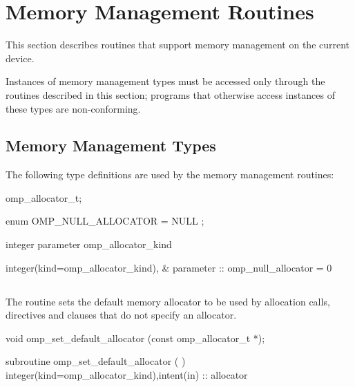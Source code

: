 \section{Memory Management Routines}
\label{sec:Memory Management Routines}
This section describes routines that support memory management on the current device.

Instances of memory management types must be accessed only through the routines described in this section; programs that otherwise access instances of these types are non-conforming.

\subsection{Memory Management Types}
\label{subsec:Memory Management Types}

The following type definitions are used by the memory management routines:

\begin{ccppspecific}
\begin{ompEnv}
omp_allocator_t;

enum { OMP_NULL_ALLOCATOR = NULL };
\end{ompEnv}
\end{ccppspecific}

\begin{fortranspecific}
\begin{ompfEnum}
integer parameter omp_allocator_kind

integer(kind=omp_allocator_kind), &
        parameter :: omp_null_allocator = 0
\end{ompfEnum}
\end{fortranspecific}

\subsection{}
\label{subsec:omp_set_default_allocator}

\summary
The  routine sets the default memory allocator to be used by allocation calls,  directives and  clauses that do not specify an allocator.

\format
\ccppspecificstart
\begin{ompcFunction}
void omp_set_default_allocator (const omp_allocator_t *);
\end{ompcFunction}
\ccppspecificend
\fortranspecificstart
\begin{ompfSubroutine}
subroutine omp_set_default_allocator (  )
integer(kind=omp_allocator_kind),intent(in) :: allocator
\end{ompfSubroutine}
\fortranspecificend

